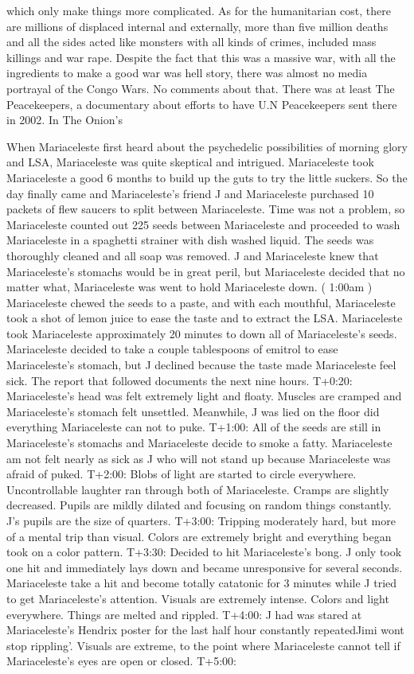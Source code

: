 \documentclass[12pt]{book}
\begin{document}
which only make things more complicated. As for the humanitarian cost, there are millions of displaced internal and externally, more than five million deaths and all the sides acted like monsters with all kinds of crimes, included mass killings and war rape. Despite the fact that this was a massive war, with all the ingredients to make a good war was hell story, there was almost no media portrayal of the Congo Wars. No comments about that. There was at least The Peacekeepers, a documentary about efforts to have U.N Peacekeepers sent there in 2002. In The Onion's



When Mariaceleste first heard about the psychedelic possibilities of morning glory and LSA, Mariaceleste was quite skeptical and intrigued. Mariaceleste took Mariaceleste a good 6 months to build up the guts to try the little suckers. So the day finally came and Mariaceleste's friend J and Mariaceleste purchased 10 packets of flew saucers to split between Mariaceleste. Time was not a problem, so Mariaceleste counted out 225 seeds between Mariaceleste and proceeded to wash Mariaceleste in a spaghetti strainer with dish washed liquid. The seeds was thoroughly cleaned and all soap was removed. J and Mariaceleste knew that Mariaceleste's stomachs would be in great peril, but Mariaceleste decided that no matter what, Mariaceleste was went to hold Mariaceleste down. ( 1:00am ) Mariaceleste chewed the seeds to a paste, and with each mouthful, Mariaceleste took a shot of lemon juice to ease the taste and to extract the LSA. Mariaceleste took Mariaceleste approximately 20 minutes to down all of Mariaceleste's seeds. Mariaceleste decided to take a couple tablespoons of emitrol to ease Mariaceleste's stomach, but J declined because the taste made Mariaceleste feel sick. The report that followed documents the next nine hours. T+0:20: Mariaceleste's head was felt extremely light and floaty. Muscles are cramped and Mariaceleste's stomach felt unsettled. Meanwhile, J was lied on the floor did everything Mariaceleste can not to puke. T+1:00: All of the seeds are still in Mariaceleste's stomachs and Mariaceleste decide to smoke a fatty. Mariaceleste am not felt nearly as sick as J who will not stand up because Mariaceleste was afraid of puked. T+2:00: Blobs of light are started to circle everywhere. Uncontrollable laughter ran through both of Mariaceleste. Cramps are slightly decreased. Pupils are mildly dilated and focusing on random things constantly. J's pupils are the size of quarters. T+3:00: Tripping moderately hard, but more of a mental trip than visual. Colors are extremely bright and everything began took on a color pattern. T+3:30: Decided to hit Mariaceleste's bong. J only took one hit and immediately lays down and became unresponsive for several seconds. Mariaceleste take a hit and become totally catatonic for 3 minutes while J tried to get Mariaceleste's attention. Visuals are extremely intense. Colors and light everywhere. Things are melted and rippled. T+4:00: J had was stared at Mariaceleste's Hendrix poster for the last half hour constantly repeatedJimi wont stop rippling'. Visuals are extreme, to the point where Mariaceleste cannot tell if Mariaceleste's eyes are open or closed. T+5:00: 
\end{document}
